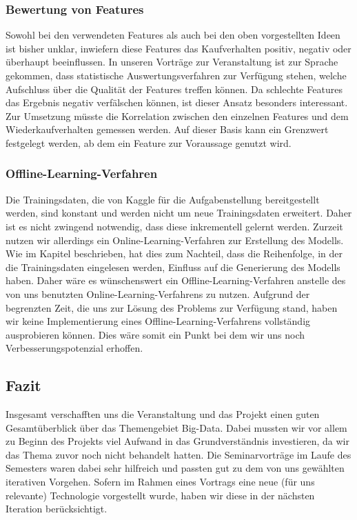 \subsubsection{Bewertung von Features}	
Sowohl bei den verwendeten Features als auch bei den oben vorgestellten Ideen ist bisher unklar, inwiefern diese Features das Kaufverhalten positiv, negativ oder überhaupt beeinflussen.
In unseren Vorträge zur Veranstaltung ist zur Sprache gekommen, dass statistische Auswertungsverfahren zur Verfügung stehen, welche Aufschluss über die Qualität der Features treffen können. Da schlechte Features das Ergebnis negativ verfälschen können, ist dieser Ansatz besonders interessant.
Zur Umsetzung müsste die Korrelation zwischen den einzelnen Features und dem Wiederkaufverhalten gemessen werden. Auf dieser Basis kann ein Grenzwert festgelegt werden, ab dem ein Feature
zur Voraussage genutzt wird.

\subsubsection{Offline-Learning-Verfahren}	
Die Trainingsdaten, die von Kaggle für die Aufgabenstellung bereitgestellt werden, sind konstant und werden 
nicht um neue Trainingsdaten erweitert. Daher ist es nicht zwingend notwendig, dass diese inkrementell gelernt
werden. Zurzeit nutzen wir allerdings ein Online-Learning-Verfahren zur Erstellung des Modells. Wie im Kapitel
 beschrieben, hat dies zum Nachteil, dass die Reihenfolge, in der die Trainingsdaten
eingelesen werden, Einfluss auf die Generierung des Modells haben. Daher wäre es wünschenswert ein Offline-Learning-Verfahren
anstelle des von uns benutzten Online-Learning-Verfahrens zu nutzen. Aufgrund der begrenzten Zeit, die uns zur 
Lösung des Problems zur Verfügung stand, haben wir keine Implementierung eines Offline-Learning-Verfahrens vollständig 
ausprobieren können. Dies wäre somit ein Punkt bei dem wir uns noch Verbesserungspotenzial erhoffen.

\subsection{Fazit}
Insgesamt verschafften uns die Veranstaltung und das Projekt einen guten Gesamtüberblick über das Themengebiet Big-Data. Dabei mussten wir vor allem zu Beginn des Projekts viel Aufwand in das Grundverständnis investieren, da wir das Thema zuvor noch nicht behandelt hatten. Die Seminarvorträge im Laufe des Semesters waren dabei sehr hilfreich und passten gut zu dem von uns gewählten iterativen Vorgehen. Sofern im Rahmen eines Vortrags eine neue (für uns relevante) Technologie vorgestellt wurde, haben wir diese in der nächsten Iteration berücksichtigt.  

